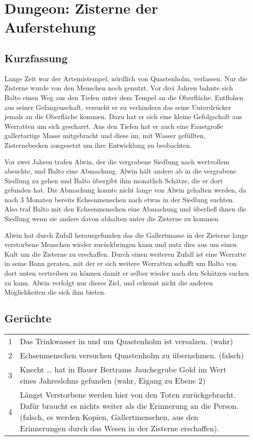 \section{Dungeon: Zisterne der Auferstehung}

\subsection{Kurzfassung}

Lange Zeit war der Artemistempel, nördlich von Quastenholm,
verlassen. Nur die Zisterne wurde von den Menschen noch genutzt. Vor
drei Jahren bahnte sich Balto einen Weg aus den Tiefen unter dem Tempel
an die Oberfläche. Entflohen aus seiner Gefangenschaft, versucht er zu
verhindern das seine Unterdrücker jemals an die Oberfläche kommen. Dazu
hat er sich eine kleine Gefolgschaft aus Werratten um sich gescharrt. Aus
den Tiefen hat er auch eine Faustgroße gallertartige Masse mitgebracht
und diese im, mit Wasser gefüllten, Zisternebecken ausgesetzt um ihre
Entwicklung zu beobachten.

Vor zwei Jahren trafen Alwin, der die vergrabene Siedlung nach
wertvollem absuchte, und Balto eine Abmachung. Alwin hält andere ab
in die vergrabene Siedlung zu gehen und Balto übergibt ihm monatlich
Schätze, die er dort gefunden hat. Die Abmachung konnte nicht lange von
Alwin gehalten werden, da nach 3 Monaten bereits Echsenmenschen nach
etwas in der Siedlung suchten. Also traf Balto mit den Echsenmenschen
eine Abmachung und überließ ihnen die Siedlung wenn sie andere davon
abhalten unter die Zisterne zu kommen.

Alwin hat durch Zufall herausgefunden das die Gallertmasse in der Zisterne
lange verstorbene Menschen wieder zurückbringen kann und nutz dies aus um
einen Kult um die Zisterne zu erschaffen. Durch einen weiteren Zufall ist
eine Werratte in seine Bann geraten, mit der er sich weitere Werratten
schafft um Balto von dort unten vertreiben zu können damit er selber
wieder nach den Schätzen suchen zu kann. Alwin verfolgt nur dieses Ziel,
und erkennt nicht die anderen Möglichkeiten die sich ihm bieten.

\subsection{Gerüchte}

\begin{tabularx}{\columnwidth}{cZ}
1 & Das Trinkwasser in und um Quastenholm ist versalzen. (wahr) \\
2 & Echsenmenschen versuchen Quastenholm zu übernehmen. (falsch) \\
3 & Knecht … hat in Bauer Bertrams Jauchegrube Gold im Wert eines
    Jahreslohns gefunden (wahr, Eigang zu Ebene 2) \\
4 & Längst Verstorbene werden hier von den Toten zurückgebracht.
    Dafür braucht es nichts weiter als die Erinnerung an die Person.
    (falsch, es werden Kopien, Gallertmenschen, aus den Erinnerungen
    durch das Wesen in der Zisterne erschaffen). \\
\end{tabularx}

